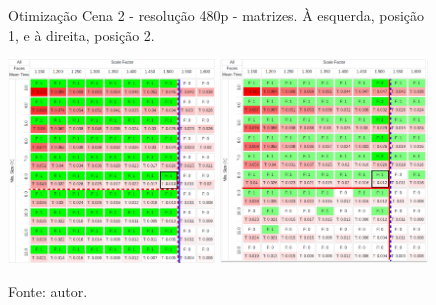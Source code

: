 \begin{figure}[H]
    \centering
    \caption[Otimização Cena 2 - resolução 480p - matrizes. À esquerda posição 1 e à direita, posição 2]{Otimização Cena 2 - resolução 480p - matrizes. À esquerda, posição 1, e à direita, posição 2.}
    \includegraphics[width=0.49\textwidth]{Cap4_Experimentos_Realizados/Figures/cena2_640x480_pos1_matriz.jpg}
    \includegraphics[width=0.49\textwidth]{Cap4_Experimentos_Realizados/Figures/cena2_640x480_pos2_matriz.jpg}
    \caption*{Fonte: autor.}
    \label{fig:otimizacaoCena2_480p_matrizes}
\end{figure}

